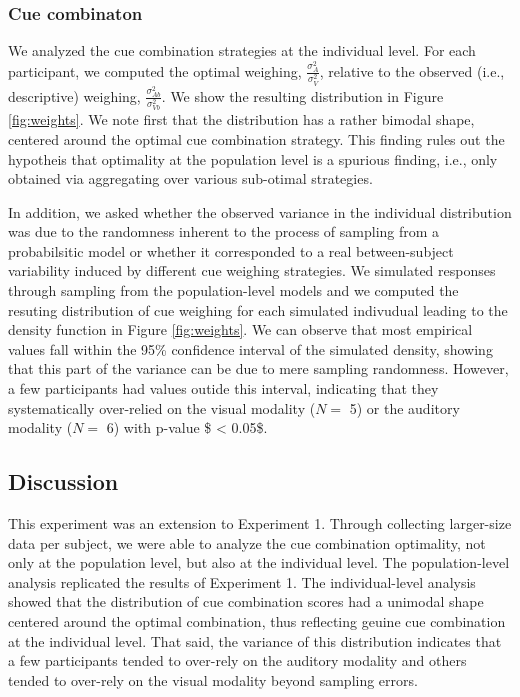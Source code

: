 \documentclass[english,,man,floatsintext]{apa6}
\theoremstyle{definition}
\theoremstyle{definition}
\theoremstyle{definition}
\theoremstyle{remark}
\begin{document}
\subsubsection{Cue combinaton}\label{cue-combinaton}

We analyzed the cue combination strategies at the individual level. For
each participant, we computed the optimal weighing,
\(\frac{\sigma^2_{A}}{\sigma^2_{V}}\), relative to the observed (i.e.,
descriptive) weighing, \(\frac{\sigma^2_{Ab}}{\sigma^2_{Vb}}\). We show
the resulting distribution in Figure \ref{fig:weights}. We note first
that the distribution has a rather bimodal shape, centered around the
optimal cue combination strategy. This finding rules out the hypotheis
that optimality at the population level is a spurious finding, i.e.,
only obtained via aggregating over various sub-otimal strategies.

In addition, we asked whether the observed variance in the individual
distribution was due to the randomness inherent to the process of
sampling from a probabilsitic model or whether it corresponded to a real
between-subject variability induced by different cue weighing
strategies. We simulated responses through sampling from the
population-level models and we computed the resuting distribution of cue
weighing for each simulated indivudual leading to the density function
in Figure \ref{fig:weights}. We can observe that most empirical values
fall within the 95\% confidence interval of the simulated density,
showing that this part of the variance can be due to mere sampling
randomness. However, a few participants had values outide this interval,
indicating that they systematically over-relied on the visual modality
(\(N=\) 5) or the auditory modality (\(N=\) 6) with p-value \$
\textless{} 0.05\$.

\subsection{Discussion}\label{discussion-3}

This experiment was an extension to Experiment 1. Through collecting
larger-size data per subject, we were able to analyze the cue
combination optimality, not only at the population level, but also at
the individual level. The population-level analysis replicated the
results of Experiment 1. The individual-level analysis showed that the
distribution of cue combination scores had a unimodal shape centered
around the optimal combination, thus reflecting geuine cue combination
at the individual level. That said, the variance of this distribution
indicates that a few participants tended to over-rely on the auditory
modality and others tended to over-rely on the visual modality beyond
sampling errors.
\end{document}
